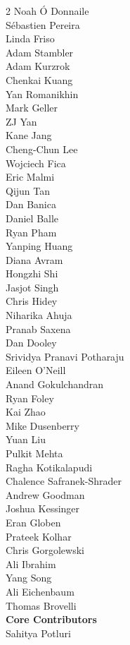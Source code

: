\begin{multicols}{2}
Noah Ó Donnaile \\
Sébastien Pereira \\
Linda Friso \\
Adam Stambler \\
Adam Kurzrok  \\
Chenkai Kuang \\
Yan Romanikhin \\
Mark Geller \\
ZJ Yan \\
Kane Jang \\
Cheng-Chun Lee \\
Wojciech Fica \\
Eric Malmi \\
Qijun Tan \\
Dan Banica \\
Daniel Balle \\
Ryan Pham \\
Yanping Huang \\
Diana Avram \\
Hongzhi Shi \\
Jasjot Singh \\
Chris Hidey \\
Niharika Ahuja \\
Pranab Saxena \\
Dan Dooley \\
Srividya Pranavi Potharaju \\
Eileen O'Neill \\
Anand Gokulchandran \\
Ryan Foley \\
Kai Zhao \\
Mike Dusenberry \\
Yuan Liu \\
Pulkit Mehta \\
Ragha Kotikalapudi \\
Chalence Safranek-Shrader \\
Andrew Goodman \\
Joshua Kessinger \\
Eran Globen \\
Prateek Kolhar \\
Chris Gorgolewski \\
Ali Ibrahim \\
Yang Song \\
Ali Eichenbaum \\
Thomas Brovelli \\
\noindent
\textbf{Core Contributors} \\
Sahitya Potluri \\

\end{multicols}
